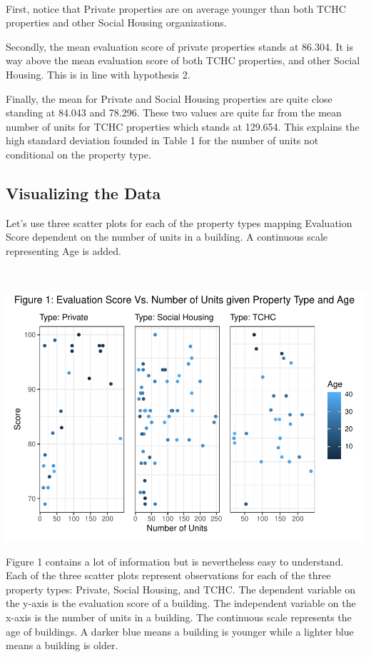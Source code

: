 \documentclass[
]{article}
\begin{document}
~

First, notice that Private properties are on average younger than both
TCHC properties and other Social Housing organizations.

Secondly, the mean evaluation score of private properties stands at
86.304. It is way above the mean evaluation score of both TCHC
properties, and other Social Housing. This is in line with hypothesis 2.

Finally, the mean for Private and Social Housing properties are quite
close standing at 84.043 and 78.296. These two values are quite far from
the mean number of units for TCHC properties which stands at 129.654.
This explains the high standard deviation founded in Table 1 for the
number of units not conditional on the property type.

\hypertarget{visualizing-the-data}{%
\subsection{Visualizing the Data}\label{visualizing-the-data}}

Let's use three scatter plots for each of the property types mapping
Evaluation Score dependent on the number of units in a building. A
continuous scale representing Age is added.

~

\includegraphics{A2_files/figure-latex/unnamed-chunk-5-1.pdf}

Figure 1 contains a lot of information but is nevertheless easy to
understand. Each of the three scatter plots represent observations for
each of the three property types: Private, Social Housing, and TCHC. The
dependent variable on the y-axis is the evaluation score of a building.
The independent variable on the x-axis is the number of units in a
building. The continuous scale represents the age of buildings. A darker
blue means a building is younger while a lighter blue means a building
is older.
\end{document}

